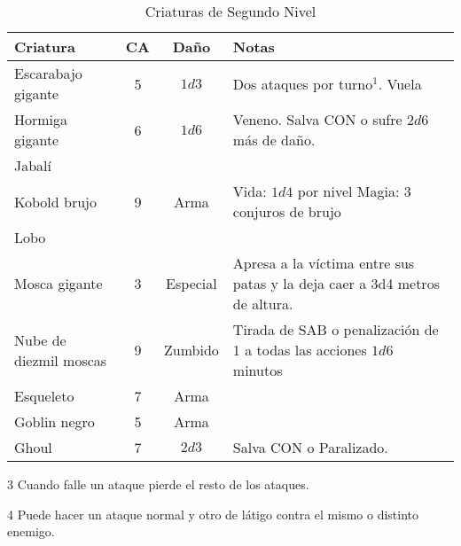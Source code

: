 \begin{table*}[p]
\caption{Criaturas de Segundo Nivel}
\label{c:animales}
\centering
\begin{threeparttable}
\begin{tabular}{lccp{8cm}}
\toprule
Criatura             & CA & Daño & Notas\\
\midrule
Escarabajo gigante   & 5 & $1d3$ & Dos ataques por turno$^1$. Vuela\\
Hormiga gigante      & 6 & $1d6$ & Veneno. Salva CON o sufre $ 2d6$ más de daño.\\
Jabalí \\
Kobold brujo         & 9 & Arma & Vida: $1d4$ por nivel Magia: 3 conjuros de brujo\\
Lobo \\
Mosca gigante        & 3 & Especial & Apresa a la víctima entre sus patas y la deja caer a 3d4 metros de altura.\\
Nube de diezmil moscas & 9 & Zumbido & Tirada de SAB o penalización de 1 a todas las acciones $1d6$ minutos\\
Esqueleto            & 7 & Arma & \\
Goblin negro         & 5 & Arma & \\
Ghoul                & 7 & $ 2d3$ & Salva CON o Paralizado.\\
\bottomrule
\bottomrule
\end{tabular}
\begin{tablenotes}
\item 3 Cuando falle un ataque pierde el resto de los ataques.
\item 4 Puede hacer un ataque normal y otro de látigo contra el mismo o distinto enemigo.
\end{tablenotes}
\end{threeparttable}
\end{table*}

